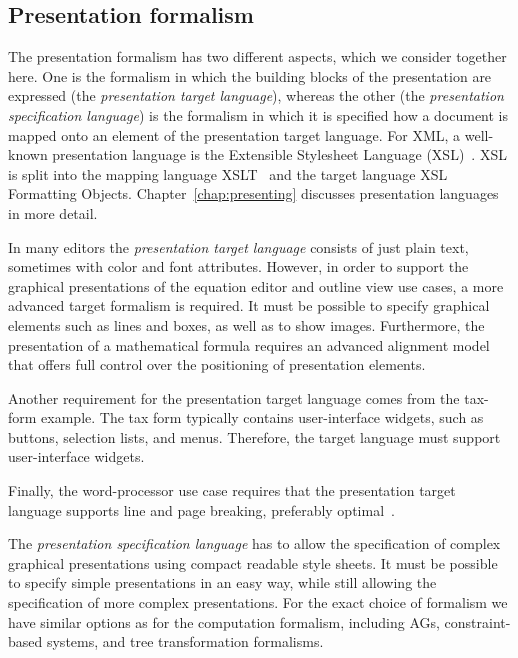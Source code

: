\documentclass{entcs}
\begin{document}
\subsection{Presentation formalism} \label{sect:presentationFormalism}

The presentation formalism has two different aspects, which we consider together here. One is the formalism in which the building blocks of the presentation are expressed (the {\em presentation target language}), whereas the other  (the {\em presentation specification language}) is the formalism in which it is specified how a document is mapped onto an element of the presentation target language. For XML, a well-known presentation language is the Extensible Stylesheet Language (XSL)~\cite{xsl10}. XSL is split into the mapping language XSLT~\cite{xslt10} and the target language XSL Formatting Objects. Chapter~\ref{chap:presenting} discusses presentation languages in more detail.

In many editors the {\em presentation target language} consists of just plain text, sometimes with color and font attributes. However, in order to support the graphical presentations of the equation editor and outline view use cases, a more advanced target formalism is required. It must be possible to specify graphical elements such as lines and boxes, as well as to show images. Furthermore, the presentation of a mathematical formula requires an advanced alignment model that offers full control over the positioning of presentation elements.

Another requirement for the presentation target language comes from the tax-form example. The tax form typically contains user-interface widgets, such as buttons, selection lists, and menus. Therefore, the target language must support user-interface widgets.


Finally, the word-processor use case requires that the presentation target language supports line and page breaking, preferably optimal~\cite{knuth82breaking}. 

The {\em presentation specification language} has to allow the specification of complex graphical presentations using compact readable style sheets. It must be possible to specify simple presentations in an easy way, while still allowing the specification of more complex presentations. For the exact choice of formalism we have similar options as for the computation formalism, including AGs, constraint-based systems, and tree transformation formalisms.
\end{document}
